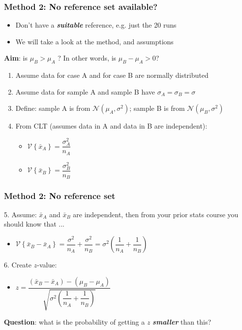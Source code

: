 \begin{frame}\frametitle{Method 2: No reference set available?}
	\begin{itemize}
		\item	Don't have a \textbf{\emph{suitable}} reference, e.g. just the 20 runs
		\item	We will take a look at the method, and assumptions
	\end{itemize}

	\textbf{Aim}: is $\mu_B > \mu_A$ ? In other words, is $\mu_B - \mu_A > 0$?
	\begin{enumerate}
		\item	Assume data for case A and for case B are normally distributed
		\item	Assume data for sample A and sample B have $\sigma_A = \sigma_B = \sigma$
		\item	Define: sample A is from $\mathcal{N}\left(\mu_A, \sigma^2\right)$; sample B is from $\mathcal{N}\left(\mu_B, \sigma^2\right)$
		\item	From CLT (assumes data in A and data in B are independent):  {\color{myOrange}{\small $\longleftarrow$ but, but ... we know that's not true here!}}
			\begin{itemize}
				\item	$\mathcal{V}\left\{\bar{x}_A\right\} = \dfrac{\sigma^2_A}{n_A}$
				\item	$\mathcal{V}\left\{\bar{x}_B\right\} = \dfrac{\sigma^2_B}{n_B}$
			\end{itemize}
	\end{enumerate}
	
\end{frame}

\begin{frame}\frametitle{Method 2: No reference set}

	5. Assume: $\bar{x}_A$ and $\bar{x}_B$ are independent, then {\scriptsize from your prior stats course you should know that ...}
	\begin{itemize}
		\item	$\mathcal{V}\left\{\bar{x}_B - \bar{x}_A\right\} = \dfrac{\sigma^2}{n_A} + \dfrac{\sigma^2}{n_B} = \sigma^2 \left(\dfrac{1}{n_A} + \dfrac{1}{n_B}\right)$
	\end{itemize}

	6. Create $z$-value:
	\begin{itemize}
		\item	$z = \dfrac{(\bar{x}_B - \bar{x}_A) - (\mu_B - \mu_A)}{\sqrt{\sigma^2 \left(\dfrac{1}{n_A} + \dfrac{1}{n_B}\right)}}$
	\end{itemize}

	\textbf{Question}: what is the probability of getting a $z$ \textbf{\emph{smaller}} than this?
\end{frame}

